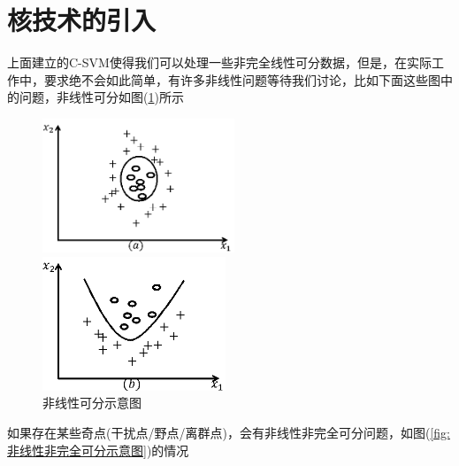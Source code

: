 \section{核技术的引入}
	\par
	上面建立的C-SVM使得我们可以处理一些非完全线性可分数据，但是，在实际工作中，要求绝不会如此简单，有许多非线性问题等待我们讨论，比如下面这些图中的问题，非线性可分如图(\ref{fig:非线性可分示意图})所示
		\begin{figure}[H]
		\centering
		\begin{varwidth}[t]{\textwidth}
		\vspace{0pt}
		\includegraphics[height=4cm]{images/Nonlinear_classify1.jpg}
		\end{varwidth}
		\qquad \qquad
		\begin{varwidth}[t]{\textwidth}
		\vspace{0pt}
		\includegraphics[height=4cm]{images/Nonlinear_classify2.jpg}
		\end{varwidth}
		\caption{非线性可分示意图}
		\label{fig:非线性可分示意图}
		\end{figure}
	如果存在某些奇点(干扰点/野点/离群点)，会有非线性非完全可分问题，如图(\ref{fig:非线性非完全可分示意图})的情况
